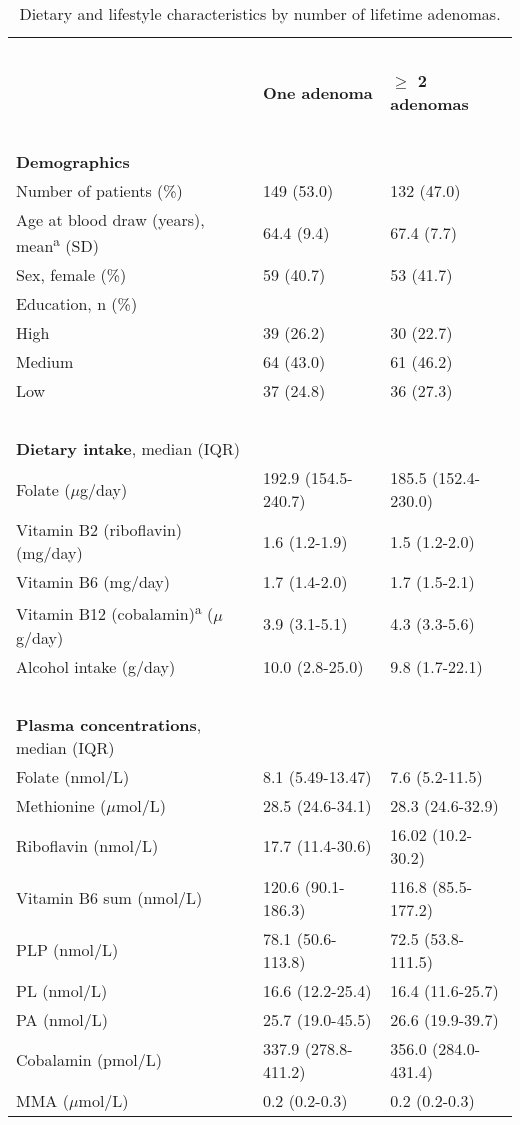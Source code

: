 \begin{table}
\caption{Dietary and lifestyle characteristics by number of lifetime adenomas.}
\label{table5_1}
\begin{adjustbox}{width=\textwidth}
\renewcommand{\arraystretch}{1.1}
\begin{tabular}{L{6.4cm}C{3cm}C{3cm}}
\hline
~ & ~ & ~ \\
~ & \bfseries\color{black} One adenoma & \bfseries\color{black} ${\geq}$ 2
adenomas\\
~ & ~ & ~ \\
\hline
\bfseries Demographics & ~ & ~ \\
Number of patients (\%) & 149 (53.0) & 132 (47.0)\\
Age at blood draw (years), mean\textsuperscript{a} (SD) & 64.4 (9.4) & 67.4 (7.7)\\
Sex, female (\%) & 59 (40.7) & 53 (41.7)\\
Education, n (\%) & ~ & ~ \\
\quad High & 39 (26.2) & 30 (22.7) \\
\quad Medium & 64 (43.0) & 61 (46.2) \\
\quad Low & 37 (24.8) & 36 (27.3) \\
~ & ~ & ~ \\
\textbf{Dietary intake}, median (IQR) & ~ & ~ \\
Folate (\textrm{${\mu}$}g/day) & 192.9 (154.5-240.7) & 185.5 (152.4-230.0)\\
Vitamin B2 (riboflavin) (mg/day) & 1.6 (1.2-1.9) & 1.5 (1.2-2.0)\\
Vitamin B6 (mg/day) & 1.7 (1.4-2.0) & 1.7 (1.5-2.1)\\
Vitamin B12 (cobalamin)\textsuperscript{a} (${\mu}$g/day) & 3.9 (3.1-5.1) & 4.3 (3.3-5.6)\\
Alcohol intake (g/day) & 10.0 (2.8-25.0) & 9.8 (1.7-22.1)\\
~ & ~ & ~ \\
\textbf{Plasma concentrations}, median (IQR) & ~ & ~ \\
Folate (nmol/L) & 8.1 (5.49-13.47) & 7.6 (5.2-11.5)\\
Methionine (\textrm{${\mu}$}mol/L) & 28.5 (24.6-34.1) & 28.3 (24.6-32.9)\\
Riboflavin (nmol/L) & 17.7 (11.4-30.6) & 16.02 (10.2-30.2)\\
Vitamin B6 sum (nmol/L) & 120.6 (90.1-186.3) & 116.8 (85.5-177.2)\\
PLP (nmol/L) & 78.1 (50.6-113.8) & 72.5 (53.8-111.5)\\
PL (nmol/L) & 16.6 (12.2-25.4) & 16.4 (11.6-25.7)\\
PA (nmol/L) & 25.7 (19.0-45.5) & 26.6 (19.9-39.7)\\
Cobalamin (pmol/L) & 337.9 (278.8-411.2) & 356.0 (284.0-431.4)\\
MMA (\textrm{${\mu}$}{mol/L)} & 0.2 (0.2-0.3) & {0.2 (0.2-0.3})\\
\end{tabular}
\end{adjustbox}
\end{table}

